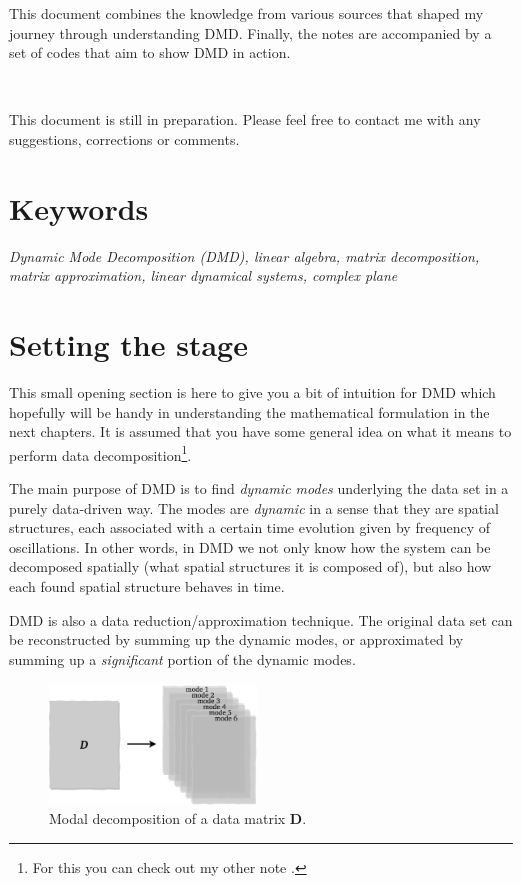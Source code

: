 \documentclass[10pt,twocolumn]{article}
\begin{document}
This document combines the knowledge from various sources that shaped my journey through understanding DMD. Finally, the notes are accompanied by a set of codes that aim to show DMD in action.

\,\,

This document is still in preparation. Please feel free to contact me with any suggestions, corrections or comments.

\section*{Keywords}

\textit{Dynamic Mode Decomposition (DMD), linear algebra, matrix decomposition, matrix approximation, linear dynamical systems, complex plane}



\tableofcontents


\section{Setting the stage}

This small opening section is here to give you a bit of intuition for DMD which hopefully will be handy in understanding the mathematical formulation in the next chapters. It is assumed that you have some general idea on what it means to perform data decomposition\footnote{For this you can check out my other note \cite{Zdybal_data_dec}.}.

The main purpose of DMD is to find \textit{dynamic modes} underlying the data set in a purely data-driven way. The modes are \textit{dynamic} in a sense that they are spatial structures, each associated with a certain time evolution given by frequency of oscillations. In other words, in DMD we not only know how the system can be decomposed spatially (what spatial structures it is composed of), but also how each found spatial structure behaves in time.

DMD is also a data reduction/approximation technique. The original data set can be reconstructed by summing up the dynamic modes, or approximated by summing up a \textit{significant} portion of the dynamic modes.

\begin{figure}[H]
\centering\includegraphics[width=5.5cm]{DMD-modal-decomposition.png}
\caption{Modal decomposition of a data matrix $\mathbf{D}$.}
\label{fig:modal-decomposition}
\end{figure}
\end{document}

